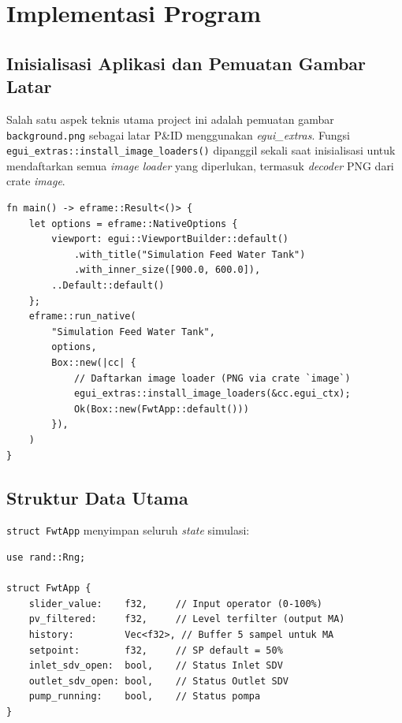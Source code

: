 \documentclass[12pt,a4paper]{article}
\begin{document}
\section{Implementasi Program}

\subsection{Inisialisasi Aplikasi dan Pemuatan Gambar Latar}
Salah satu aspek teknis utama project ini adalah pemuatan gambar
\texttt{background.png} sebagai latar P\&ID menggunakan
\textit{egui\_extras}. Fungsi \texttt{egui\_extras::install\_image\_loaders()}
dipanggil sekali saat inisialisasi untuk mendaftarkan semua
\textit{image loader} yang diperlukan, termasuk \textit{decoder} PNG
dari crate \textit{image}.

\begin{lstlisting}[caption={Inisialisasi eframe dan image loader}]
fn main() -> eframe::Result<()> {
    let options = eframe::NativeOptions {
        viewport: egui::ViewportBuilder::default()
            .with_title("Simulation Feed Water Tank")
            .with_inner_size([900.0, 600.0]),
        ..Default::default()
    };
    eframe::run_native(
        "Simulation Feed Water Tank",
        options,
        Box::new(|cc| {
            // Daftarkan image loader (PNG via crate `image`)
            egui_extras::install_image_loaders(&cc.egui_ctx);
            Ok(Box::new(FwtApp::default()))
        }),
    )
}
\end{lstlisting}

\subsection{Struktur Data Utama}
\texttt{struct FwtApp} menyimpan seluruh \textit{state} simulasi:

\begin{lstlisting}[caption={Definisi struct FwtApp}]
use rand::Rng;

struct FwtApp {
    slider_value:    f32,     // Input operator (0-100%)
    pv_filtered:     f32,     // Level terfilter (output MA)
    history:         Vec<f32>, // Buffer 5 sampel untuk MA
    setpoint:        f32,     // SP default = 50%
    inlet_sdv_open:  bool,    // Status Inlet SDV
    outlet_sdv_open: bool,    // Status Outlet SDV
    pump_running:    bool,    // Status pompa
}
\end{lstlisting}
\end{document}
